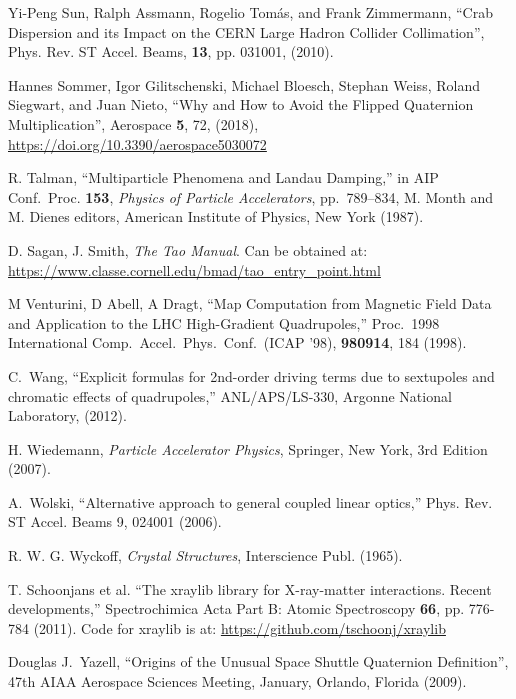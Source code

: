 \begin{thebibliography}{XXXXXXX99}
Yi-Peng Sun, Ralph Assmann, Rogelio Tom\'as, and Frank Zimmermann,
``Crab Dispersion and its Impact on the CERN Large Hadron Collider Collimation'',
Phys. Rev. ST Accel. Beams, {\bf 13}, pp. 031001, (2010).

Hannes Sommer, Igor Gilitschenski, Michael Bloesch, Stephan Weiss, Roland Siegwart, and Juan Nieto,
``Why and How to Avoid the Flipped Quaternion Multiplication'',
Aerospace {\bf 5}, 72, (2018), \hfill\break
\hspace*{0.3in}
\url{https://doi.org/10.3390/aerospace5030072}

 R. Talman, ``Multiparticle Phenomena and
Landau Damping,'' in AIP Conf.\ Proc.  {\bf 153}, {\em Physics of
Particle Accelerators}, pp.~789--834, M. Month and M. Dienes editors,
American Institute of Physics, New York (1987).

D. Sagan, J. Smith, {\it The Tao Manual}.
Can be obtained at: \hfill\break
\hspace*{0.3in}
\url{https://www.classe.cornell.edu/bmad/tao_entry_point.html}

M Venturini, D Abell, A Dragt, 
``Map Computation from Magnetic Field Data and Application to the LHC
High-Gradient Quadrupoles,'' 
Proc.\ 1998 International Comp.\ Accel.\ Phys.\ Conf.\ (ICAP '98),
{\bf 980914}, 184 (1998).

C.~Wang,
``Explicit formulas for 2nd-order driving terms due to sextupoles and
chromatic effects of quadrupoles,''
ANL/APS/LS-330, Argonne National Laboratory, (2012).

H. Wiedemann, {\em Particle Accelerator Physics}, Springer, New York, 3rd Edition (2007). 

A.~Wolski,  ``Alternative approach to general coupled linear optics,''
Phys. Rev. ST Accel. Beams 9, 024001 (2006).

R. W. G. Wyckoff, {\em Crystal Structures}, Interscience Publ. (1965).

T. Schoonjans et al. ``The xraylib library for X-ray-matter
interactions. Recent developments,'' Spectrochimica Acta Part B: Atomic
Spectroscopy {\bf 66}, pp. 776-784 (2011).
Code for xraylib is at: \hfill\break
\hspace*{0.3in}
\url{https://github.com/tschoonj/xraylib}

Douglas J.~Yazell,
``Origins of the Unusual Space Shuttle Quaternion Definition'',
47th AIAA Aerospace Sciences Meeting, January, Orlando, Florida (2009).

\end{thebibliography}
